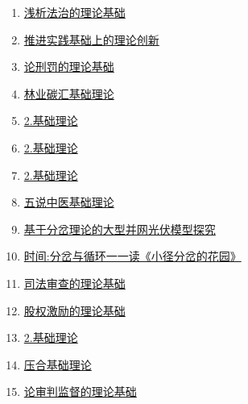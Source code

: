 \documentclass{article}
\begin{document}
\begin{enumerate}
\item
  \href{https://www.ixueshu.com/api/search/info/6880d4cbb106d1b5118132ff7262483a318947a18e7f9386.html?from=pdf}{{浅析法治的理论基础}}
\item
  \href{https://www.ixueshu.com/api/search/info/be6c862ae782c14116db0ecbc89e9363318947a18e7f9386.html?from=pdf}{{推进实践基础上的理论创新}}
\item
  \href{https://www.ixueshu.com/api/search/info/9ccb7b1c7a71e8ff196b6afc955132aa318947a18e7f9386.html?from=pdf}{{论刑罚的理论基础}}
\item
  \href{https://www.ixueshu.com/api/search/info/466acba9d1aca3e9dbfaafda5ab043e5318947a18e7f9386.html?from=pdf}{{林业碳汇基础理论}}
\item
  \href{https://www.ixueshu.com/api/search/info/16c147a8ae4f40389de819c7de14e6c1318947a18e7f9386.html?from=pdf}{{2.基础理论}}
\item
  \href{https://www.ixueshu.com/api/search/info/16c147a8ae4f4038dea0003605e9c285318947a18e7f9386.html?from=pdf}{{2.基础理论}}
\item
  \href{https://www.ixueshu.com/api/search/info/16c147a8ae4f4038de5b09912d765bc6318947a18e7f9386.html?from=pdf}{{2.基础理论}}
\item
  \href{https://www.ixueshu.com/api/search/info/a1a89c49bc6bff80c053408afcfe304f318947a18e7f9386.html?from=pdf}{{五说中医基础理论}}
\item
  \href{https://www.ixueshu.com/api/search/info/f21b7d05519c5911d4ede80fbfca742f318947a18e7f9386.html?from=pdf}{{基于分岔理论的大型并网光伏模型探究}}
\item
  \href{https://www.ixueshu.com/api/search/info/0d3f00e8fa9f0eac475c5786c9cc24cc318947a18e7f9386.html?from=pdf}{{时间:分岔与循环一一读《小径分岔的花园》}}
\item
  \href{https://www.ixueshu.com/api/search/info/07ab6bb454441f20625d627589b464f8318947a18e7f9386.html?from=pdf}{{司法审查的理论基础}}
\item
  \href{https://www.ixueshu.com/api/search/info/6f6ebb7bc153a6a8fbff1aa1b4487f78318947a18e7f9386.html?from=pdf}{{股权激励的理论基础}}
\item
  \href{https://www.ixueshu.com/api/search/info/c52eb7b044f9bfff47a4173522984669318947a18e7f9386.html?from=pdf}{{2.基础理论}}
\item
  \href{https://www.ixueshu.com/api/search/info/a0d7bb67273064f3c9b51cf1a4080b65318947a18e7f9386.html?from=pdf}{{压合基础理论}}
\item
  \href{https://www.ixueshu.com/api/search/info/c2ce2a60dbe1de5d7506eab85b64a851318947a18e7f9386.html?from=pdf}{{论审判监督的理论基础}}

\end{enumerate}
\end{document}
